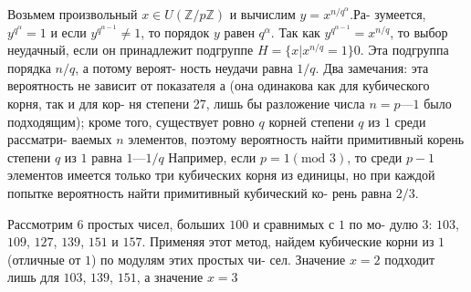 \documentclass{../template/mai_book}
\begin{document}
Возьмем произвольный $x \in U(\mathbb{Z}/p\mathbb{Z})$ и вычислим $y = x^{n/q^{\alpha}}$.Ра­-\linebreak
зумеется, $y^{q^{\alpha}} = 1$ и если $y^{q^{\alpha - 1}} \ne 1$, то порядок $y$ равен $q^{\alpha}$. Так как\linebreak
$y^{q^{\alpha -1}} = x^{n/q}$, то выбор неудачный, если он принадлежит подгруппе\linebreak
$H = \{x | x^{n/q} = 1\}0$. Эта подгруппа порядка $n/q$, а потому вероят-\linebreak
ность неудачи равна $1/q$. Два замечания: эта вероятность не зависит от\linebreak
показателя а (она одинакова как для кубического корня, так и для кор­-\linebreak
ня степени 27, лишь бы разложение числа $n = p — 1$ было подходящим);\linebreak
кроме того, существует ровно $q$ корней степени $q$ из $1$ среди рассматри­-\linebreak
ваемых $n$ элементов, поэтому вероятность найти примитивный корень\linebreak
степени $q$ из $1$ равна $1 — 1/q$ Например, если $p = 1 (\text{mod } 3)$, то среди\linebreak
$p-1$ элементов имеется только три кубических корня из единицы, но\linebreak
при каждой попытке вероятность найти примитивный кубический ко­-\linebreak
рень равна $2/3$.

Рассмотрим $6$ простых чисел, больших $100$ и сравнимых с $1$ по мо­-\linebreak
дулю $3$: $103$, $109$, $127$, $139$, $151$ и $157$. Применяя этот метод, найдем\linebreak
кубические корни из $1$ (отличные от $1$) по модулям этих простых чи­-\linebreak
сел. Значение $x = 2$ подходит лишь для $103$, $139$, $151$, а значение $x = 3$\linebreak
\end{document}
